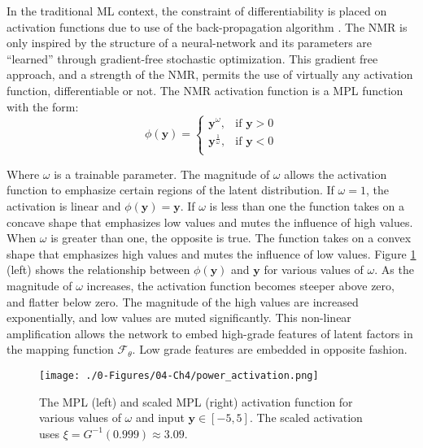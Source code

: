 In the traditional \gls{ML} context, the constraint of differentiability is placed on activation functions due to use of the back-propagation algorithm \citep{rojas1996backpropagation}. The \gls{NMR} is only inspired by the structure of a neural-network and its parameters are ``learned'' through gradient-free stochastic optimization. This gradient free approach, and a strength of the \gls{NMR}, permits the use of virtually any activation function, differentiable or not. The \gls{NMR} activation function is a \gls{MPL} function with the form:
\begin{equation}
    \phi \left( \mathbf{y} \right) =
    \begin{cases}
        \mathbf{y}^{\omega},           & \text{if $\mathbf{y} > 0$} \\
        \mathbf{y}^{\frac{1}{\omega}}, & \text{if $\mathbf{y} < 0$} \\
    \end{cases}
    \label{eq:power}
\end{equation}

Where $\omega$ is a trainable parameter. The magnitude of $\omega$ allows the activation function to emphasize certain regions of the latent distribution. If $\omega = 1$, the activation is linear and $\phi \left( \mathbf{y} \right)=\mathbf{y}$. If $\omega$ is less than one the function takes on a concave shape that emphasizes low values and mutes the influence of high values. When $\omega$ is greater than one, the opposite is true. The function takes on a convex shape that emphasizes high values and mutes the influence of low values. Figure \ref{fig:power_activation} (left) shows the relationship between $\phi \left( \mathbf{y} \right)$ and $\mathbf{y}$ for various values of $\omega$. As the magnitude of $\omega$ increases, the activation function becomes steeper above zero, and flatter below zero. The magnitude of the high values are increased exponentially, and low values are muted significantly. This non-linear amplification allows the network to embed high-grade features of latent factors in the mapping function $\mathcal{F}_{\theta}$. Low grade features are embedded in opposite fashion.

\begin{figure}[htb!]
    \centering
    \texttt{[image: ./0-Figures/04-Ch4/power\_activation.png]}
    \caption{The \gls{MPL} (left) and scaled \gls{MPL} (right) activation function for various values of $\omega$ and input $\mathbf{y} \in [-5,5]$. The scaled activation uses $\xi = G^{-1}(0.999) \approx 3.09$. }
    \label{fig:power_activation}
\end{figure}

